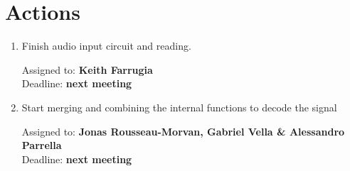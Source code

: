 \documentclass{cce2014-meetings}
\begin{document}
\section*{Actions}

\begin{enumerate}

      \item Finish audio input circuit and reading.
      \begin{flushright}
            Assigned to: \textbf{Keith Farrugia}\\
            Deadline: \textbf{next meeting}
      \end{flushright}

      \item Start merging and combining the internal functions to decode the signal
      \begin{flushright}
            Assigned to: \textbf{Jonas Rousseau-Morvan, Gabriel Vella \& Alessandro Parrella}\\
            Deadline: \textbf{next meeting}
      \end{flushright}

\end{enumerate}
\end{document}
